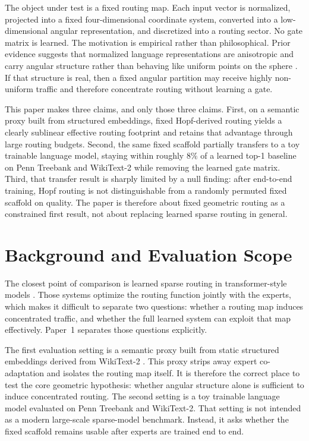 \documentclass{article}
\begin{document}
The object under test is a fixed routing map. Each input vector is normalized, projected into a fixed four-dimensional coordinate system, converted into a low-dimensional angular representation, and discretized into a routing sector. No gate matrix is learned. The motivation is empirical rather than philosophical. Prior evidence suggests that normalized language representations are anisotropic and carry angular structure rather than behaving like uniform points on the sphere \citep{turboquant2026}. If that structure is real, then a fixed angular partition may receive highly non-uniform traffic and therefore concentrate routing without learning a gate.

This paper makes three claims, and only those three claims. First, on a semantic proxy built from structured embeddings, fixed Hopf-derived routing yields a clearly sublinear effective routing footprint and retains that advantage through large routing budgets. Second, the same fixed scaffold partially transfers to a toy trainable language model, staying within roughly $8\%$ of a learned top-1 baseline on Penn Treebank and WikiText-2 while removing the learned gate matrix. Third, that transfer result is sharply limited by a null finding: after end-to-end training, Hopf routing is not distinguishable from a randomly permuted fixed scaffold on quality. The paper is therefore about fixed geometric routing as a constrained first result, not about replacing learned sparse routing in general.

\section{Background and Evaluation Scope}
The closest point of comparison is learned sparse routing in transformer-style models \citep{shazeer2017outrageously,fedus2022switch}. Those systems optimize the routing function jointly with the experts, which makes it difficult to separate two questions: whether a routing map induces concentrated traffic, and whether the full learned system can exploit that map effectively. Paper~1 separates those questions explicitly.

The first evaluation setting is a semantic proxy built from static structured embeddings derived from WikiText-2 \citep{merity2016wt2}. This proxy strips away expert co-adaptation and isolates the routing map itself. It is therefore the correct place to test the core geometric hypothesis: whether angular structure alone is sufficient to induce concentrated routing. The second setting is a toy trainable language model evaluated on Penn Treebank \citep{ptb1993} and WikiText-2. That setting is not intended as a modern large-scale sparse-model benchmark. Instead, it asks whether the fixed scaffold remains usable after experts are trained end to end.
\end{document}
